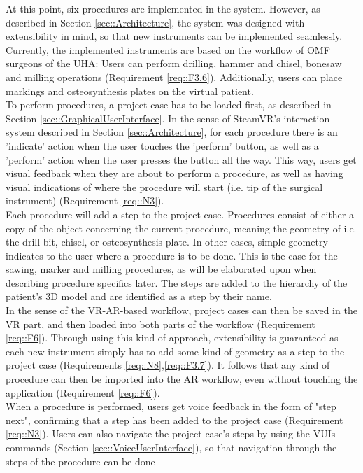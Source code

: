 At this point, six procedures are implemented in the system.
However, as described in Section \ref{sec::Architecture}, the system was designed with extensibility in mind, so that new instruments can be implemented seamlessly.
Currently, the implemented instruments are based on the workflow of OMF surgeons of the UHA: Users can perform drilling, hammer and chisel, bonesaw and milling operations (Requirement \ref{req::F3.6}).
Additionally, users can place markings and osteosynthesis plates on the virtual patient.
\\ To perform procedures, a project case has to be loaded first, as described in Section \ref{sec::GraphicalUserInterface}.
In the sense of SteamVR's interaction system described in Section \ref{sec::Architecture}, for each procedure there is an 'indicate' action when the user touches the 
'perform' button, as well as a 'perform' action when the user presses the button all the way.
This way, users get visual feedback when they are about to perform a procedure, as well as having visual indications of where the procedure will start (i.e. tip of the surgical instrument) (Requirement \ref{req::N3}).
\\ Each procedure will add a step to the project case.
Procedures consist of either a copy of the object concerning the current procedure, meaning the geometry of i.e. the drill bit, chisel, or osteosynthesis plate.
In other cases, simple geometry indicates to the user where a procedure is to be done. This is the case for the sawing, marker and milling procedures, as will be elaborated upon 
when describing procedure specifics later.
The steps are added to the hierarchy of the patient's 3D model and are identified as a step by their name.
\\ In the sense of the VR-AR-based workflow, project cases can then be saved in the VR part, and then loaded into both parts of the workflow (Requirement \ref{req::F6}).
Through using this kind of approach, extensibility is guaranteed as each new instrument simply has to add some kind of geometry as a step to the project case (Requirements \ref{req::N8},\ref{req::F3.7}).
It follows that any kind of procedure can then be imported into the AR workflow, even without touching the application (Requirement \ref{req::F6}).
\\ When a procedure is performed, users get voice feedback in the form of "step next", confirming that a step has been added to the project case (Requirement \ref{req::N3}).
Users can also navigate the project case's steps by using the VUIs commands (Section \ref{sec::VoiceUserInterface}), so that navigation through the steps of the procedure can be done 
